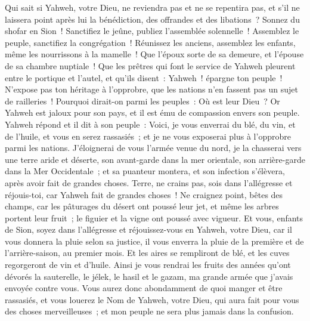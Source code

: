\begin{multicols}{2}
Qui sait si Yahweh, votre Dieu, ne reviendra pas et ne se repentira pas, et s'il ne laissera point après lui la bénédiction, des offrandes et des libations~?
Sonnez du shofar en Sion~! Sanctifiez le jeûne, publiez l'assemblée solennelle~!
Assemblez le peuple, sanctifiez la congrégation~! Réunissez les anciens, assemblez les enfants, même les nourrissons à la mamelle~! Que l'époux sorte de sa demeure, et l'épouse de sa chambre nuptiale~!
Que les prêtres qui font le service de Yahweh pleurent entre le portique et l'autel, et qu'ils disent~: Yahweh~! épargne ton peuple~! N'expose pas ton héritage à l'opprobre, que les nations n'en fassent pas un sujet de railleries~! Pourquoi dirait-on parmi les peuples~: Où est leur Dieu~?
Or Yahweh est jaloux pour son pays, et il est ému de compassion envers son peuple.
Yahweh répond et il dit à son peuple~: Voici, je vous enverrai du blé, du vin, et de l'huile, et vous en serez rassasiés~; et je ne vous exposerai plus à l'opprobre parmi les nations.
J'éloignerai de vous l'armée venue du nord, je la chasserai vers une terre aride et déserte, son avant-garde dans la mer orientale, son arrière-garde dans la Mer Occidentale~; et sa puanteur montera, et son infection s'élèvera, après avoir fait de grandes choses.
Terre, ne crains pas, sois dans l'allégresse et réjouis-toi, car Yahweh fait de grandes choses~!
Ne craignez point, bêtes des champs, car les pâturages du désert ont poussé leur jet, et même les arbres portent leur fruit~; le figuier et la vigne ont poussé avec vigueur.
Et vous, enfants de Sion, soyez dans l'allégresse et réjouissez-vous en Yahweh, votre Dieu, car il vous donnera la pluie selon sa justice, il vous enverra la pluie de la première et de l'arrière-saison, au premier mois.
Et les aires se rempliront de blé, et les cuves regorgeront de vin et d'huile.
Ainsi je vous rendrai les fruits des années qu'ont dévorés la sauterelle, le jélek, le hasil et le gazam, ma grande armée que j'avais envoyée contre vous.
Vous aurez donc abondamment de quoi manger et être rassasiés, et vous louerez le Nom de Yahweh, votre Dieu, qui aura fait pour vous des choses merveilleuses~; et mon peuple ne sera plus jamais dans la confusion.

\end{multicols}
